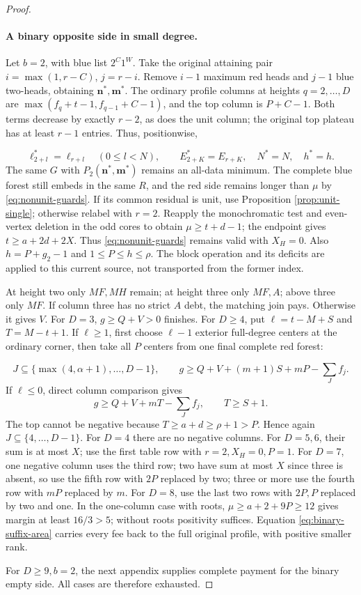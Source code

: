 \documentclass[11pt,a4paper]{article}
\newcommand{\nn}{\mathbf n}\newcommand{\mm}{\mathbf m}
\theoremstyle{definition}
\begin{document}
\begin{proof}
\paragraph{A binary opposite side in small degree.}
Let $b=2$, with blue list $2^C1^W$.
Take the original attaining pair $i=\max(1,r-C)$, $j=r-i$.
Remove $i-1$ maximum red heads and $j-1$ blue two-heads, obtaining $\nn^*,\mm^*$.
The ordinary profile columns at heights $q=2,\ldots,D$ are
$\max(f_q+t-1,f_{q-1}+C-1)$, and the top column is $P+C-1$.
Both terms decrease by exactly $r-2$, as does the unit column; the original top plateau has at least $r-1$ entries.
Thus, positionwise,

\begin{equation}\label{eq:binary-suffix-area}
 \ell^*_{2+l}=\ell_{r+l}\quad(0\le l<N),\qquad
 E^*_{2+K}=E_{r+K},\quad N^*=N,\quad h^*=h.
\end{equation}
The same $G$ with $P_2(\nn^*,\mm^*)$ remains an all-data minimum.
The complete blue forest still embeds in the same $R$, and the red side remains longer than $\mu$ by \eqref{eq:nonunit-guards}.
If its common residual is unit, use Proposition \ref{prop:unit-single}; otherwise relabel with $r=2$.
Reapply the monochromatic test and even-vertex deletion in the odd cores to obtain
$\mu\ge t+d-1$; the endpoint gives $t\ge a+2d+2X$.
Thus \eqref{eq:nonunit-guards} remains valid with $X_H=0$.
Also $h=P+g_2-1$ and $1\le P\le h\le\rho$.
The block operation and its deficits are applied to this current source, not transported from the former index.

At height two only $MF,MH$ remain; at height three only $MF,A$; above three only $MF$.
If column three has no strict $A$ debt, the matching join pays. Otherwise it gives $V$.
For $D=3$, $g\ge Q+V>0$ finishes.
For $D\ge4$, put $\ell=t-M+S$ and $T=M-t+1$.
If $\ell\ge1$, first choose $\ell-1$ exterior full-degree centers at the ordinary corner, then take all $P$ centers from one final complete red forest:

\[
 J\subseteq\{\max(4,\alpha+1),\ldots,D-1\},\qquad
 g\ge Q+V+(m+1)S+mP-\sum_Jf_j.
\]
If $\ell\le0$, direct column comparison gives
\[
 g\ge Q+V+mT-\sum_Jf_j,\qquad T\ge S+1.
\]
The top cannot be negative because $T\ge a+d\ge\rho+1>P$.
Hence again $J\subseteq\{4,\ldots,D-1\}$.
For $D=4$ there are no negative columns.
For $D=5,6$, their sum is at most $X$; use the first table row with $r=2,X_H=0,P=1$.
For $D=7$, one negative column uses the third row; two have sum at most $X$ since three is absent, so use the fifth row with $2P$ replaced by two; three or more use the fourth row with $mP$ replaced by $m$.
For $D=8$, use the last two rows with $2P,P$ replaced by two and one.
In the one-column case with roots, $\mu\ge a+2+9P\ge12$ gives margin at least $16/3>5$; without roots positivity suffices.
Equation \eqref{eq:binary-suffix-area} carries every fee back to the full original profile, with positive smaller rank.

For $D\ge9,b=2$, the next appendix supplies complete payment for the binary empty side.
All cases are therefore exhausted.
\end{proof}
\end{document}
